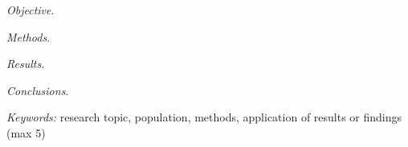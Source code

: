 


\begin{abstracts}        %
	\thispagestyle{plain} %
	
	\noindent \textit{Objective}. 
	
	\noindent \textit{Methods}. 

	\noindent \textit{Results}. 
	
	\noindent \textit{Conclusions}.
	
	\textit{Keywords:} research topic, population, methods, application of results or findings (max 5)
	
\end{abstracts}


